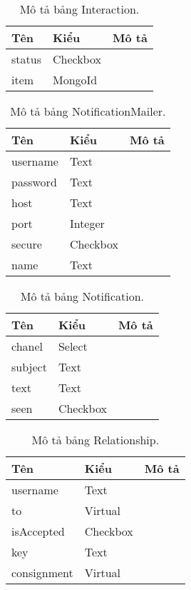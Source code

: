 \begin{table}[p]
\begin{center}
\begin{tabular}{ |l|l|l| } 
	\hline
	Tên & Kiểu & Mô tả \\
	\hline
	status & Checkbox & \dotfill \\
item & MongoId & \dotfill \\ 
	\hline
\end{tabular}
	\caption{Mô tả bảng Interaction.}
	\label{table:Interaction}
\end{center}
\end{table}


\begin{table}[p]
\begin{center}
\begin{tabular}{ |l|l|l| } 
	\hline
	Tên & Kiểu & Mô tả \\
	\hline
	username & Text & \dotfill \\
password & Text & \dotfill \\
host & Text & \dotfill \\
port & Integer & \dotfill \\
secure & Checkbox & \dotfill \\
name & Text & \dotfill \\ 
	\hline
\end{tabular}
	\caption{Mô tả bảng NotificationMailer.}
	\label{table:NotificationMailer}
\end{center}
\end{table}


\begin{table}[p]
\begin{center}
\begin{tabular}{ |l|l|l| } 
	\hline
	Tên & Kiểu & Mô tả \\
	\hline
	chanel & Select & \dotfill \\
subject & Text & \dotfill \\
text & Text & \dotfill \\
seen & Checkbox & \dotfill \\ 
	\hline
\end{tabular}
	\caption{Mô tả bảng Notification.}
	\label{table:Notification}
\end{center}
\end{table}


\begin{table}[p]
\begin{center}
\begin{tabular}{ |l|l|l| } 
	\hline
	Tên & Kiểu & Mô tả \\
	\hline
	username & Text & \dotfill \\
to & Virtual & \dotfill \\
isAccepted & Checkbox & \dotfill \\
key & Text & \dotfill \\
consignment & Virtual & \dotfill \\ 
	\hline
\end{tabular}
	\caption{Mô tả bảng Relationship.}
	\label{table:Relationship}
\end{center}
\end{table}


